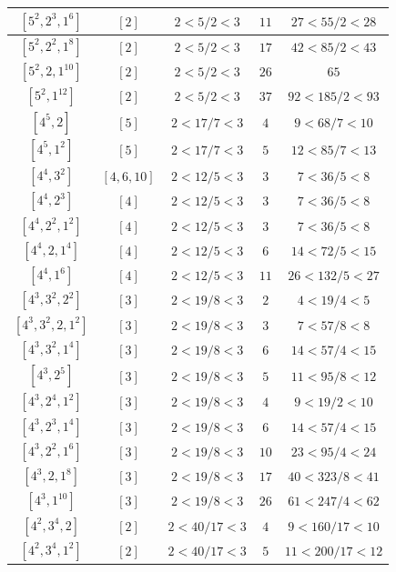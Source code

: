 \documentclass{article}%
\begin{document}
\begin{center}
\begin{longtable}{||c|c|c|c|c||}
$[5^{2}, 2^{3}, 1^{6}]$ & $[2]$ & $2 < 5/2 < 3$ & $11$ & $27 < 55/2 < 28$ \\ \hline 
$[5^{2}, 2^{2}, 1^{8}]$ & $[2]$ & $2 < 5/2 < 3$ & $17$ & $42 < 85/2 < 43$ \\ \hline 
$[5^{2}, 2, 1^{10}]$ & $[2]$ & $2 < 5/2 < 3$ & $26$ & $65$ \\ \hline 
$[5^{2}, 1^{12}]$ & $[2]$ & $2 < 5/2 < 3$ & $37$ & $92 < 185/2 < 93$ \\ \hline 
$[4^{5}, 2]$ & $[5]$ & $2 < 17/7 < 3$ & $4$ & $9 < 68/7 < 10$ \\ \hline 
$[4^{5}, 1^{2}]$ & $[5]$ & $2 < 17/7 < 3$ & $5$ & $12 < 85/7 < 13$ \\ \hline 
$[4^{4}, 3^{2}]$ & $[4, 6, 10]$ & $2 < 12/5 < 3$ & $3$ & $7 < 36/5 < 8$ \\ \hline 
$[4^{4}, 2^{3}]$ & $[4]$ & $2 < 12/5 < 3$ & $3$ & $7 < 36/5 < 8$ \\ \hline 
$[4^{4}, 2^{2}, 1^{2}]$ & $[4]$ & $2 < 12/5 < 3$ & $3$ & $7 < 36/5 < 8$ \\ \hline 
$[4^{4}, 2, 1^{4}]$ & $[4]$ & $2 < 12/5 < 3$ & $6$ & $14 < 72/5 < 15$ \\ \hline 
$[4^{4}, 1^{6}]$ & $[4]$ & $2 < 12/5 < 3$ & $11$ & $26 < 132/5 < 27$ \\ \hline 
$[4^{3}, 3^{2}, 2^{2}]$ & $[3]$ & $2 < 19/8 < 3$ & $2$ & $4 < 19/4 < 5$ \\ \hline 
$[4^{3}, 3^{2}, 2, 1^{2}]$ & $[3]$ & $2 < 19/8 < 3$ & $3$ & $7 < 57/8 < 8$ \\ \hline 
$[4^{3}, 3^{2}, 1^{4}]$ & $[3]$ & $2 < 19/8 < 3$ & $6$ & $14 < 57/4 < 15$ \\ \hline 
$[4^{3}, 2^{5}]$ & $[3]$ & $2 < 19/8 < 3$ & $5$ & $11 < 95/8 < 12$ \\ \hline 
$[4^{3}, 2^{4}, 1^{2}]$ & $[3]$ & $2 < 19/8 < 3$ & $4$ & $9 < 19/2 < 10$ \\ \hline 
$[4^{3}, 2^{3}, 1^{4}]$ & $[3]$ & $2 < 19/8 < 3$ & $6$ & $14 < 57/4 < 15$ \\ \hline 
$[4^{3}, 2^{2}, 1^{6}]$ & $[3]$ & $2 < 19/8 < 3$ & $10$ & $23 < 95/4 < 24$ \\ \hline 
$[4^{3}, 2, 1^{8}]$ & $[3]$ & $2 < 19/8 < 3$ & $17$ & $40 < 323/8 < 41$ \\ \hline 
$[4^{3}, 1^{10}]$ & $[3]$ & $2 < 19/8 < 3$ & $26$ & $61 < 247/4 < 62$ \\ \hline 
$[4^{2}, 3^{4}, 2]$ & $[2]$ & $2 < 40/17 < 3$ & $4$ & $9 < 160/17 < 10$ \\ \hline 
$[4^{2}, 3^{4}, 1^{2}]$ & $[2]$ & $2 < 40/17 < 3$ & $5$ & $11 < 200/17 < 12$ \\ \hline 

\end{longtable}
\end{center}
\end{document}
